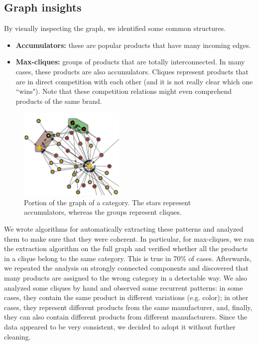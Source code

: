 \documentclass[11pt]{article}
\begin{document}
\subsection{Graph insights}
By visually inspecting the graph, we identified some common structures.
\begin{itemize}
	\item \textbf{Accumulators:} these are popular products that have many incoming edges.
	\item \textbf{Max-cliques:} groups of products that are totally interconnected. In many cases, these products are also accumulators. Cliques represent products that are in direct competition with each other (and it is not really clear which one ``wins"). Note that these competition relations might even comprehend products of the same brand.
\end{itemize}
\begin{figure}
	\centering{}
	\includegraphics[width=0.45\textwidth]{img/graph.png}
	\caption{Portion of the graph of a category. The stars represent accumulators, whereas the groups represent cliques.}
	\label{fig:graph}
\end{figure}
We wrote algorithms for automatically extracting these patterns and analyzed them to make sure that they were coherent. In particular, for max-cliques, we ran the extraction algorithm on the full graph and verified whether all the products in a clique belong to the same category. This is true in 70\% of cases. Afterwards, we repeated the analysis on strongly connected components and discovered that many products are assigned to the wrong category in a detectable way. We also analyzed some cliques by hand and observed some recurrent patterns: in some cases, they contain the same product in different variations (e.g. color); in other cases, they represent different products from the same manufacturer, and, finally, they can also contain different products from different manufacturers. Since the data appeared to be very consistent, we decided to adopt it without further cleaning.
\end{document}
